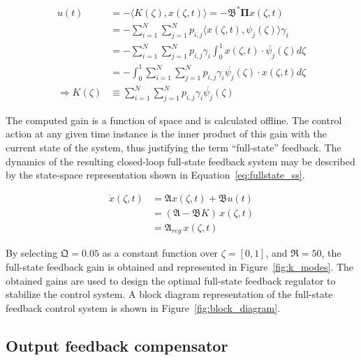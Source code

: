 \begin{equation} \label{eq:fullstate_gain}
    \begin{aligned}
        u(t) &= - \langle K(\zeta), x(\zeta, t) \rangle = - \mathfrak{B}^* \mathbf{\Pi} x(\zeta, t) \\
        &= - \sum_{i=1}^N\sum_{j=1}^N p_{i,j} \langle x(\zeta, t), \psi_j(\zeta) \rangle \gamma_i \\
        &= - \sum_{i=1}^N\sum_{j=1}^N p_{i,j} \gamma_i \int_0^1 x(\zeta, t) \cdot \overline{\psi_j}(\zeta) d\zeta \\
        &= - \int_0^1 \sum_{i=1}^N\sum_{j=1}^N p_{i,j} \gamma_i \overline{\psi_j}(\zeta) \cdot x(\zeta, t) d\zeta \\
        \Rightarrow K(\zeta) &\equiv \sum_{i=1}^N\sum_{j=1}^N p_{i,j} \gamma_i \overline{\psi_j}(\zeta)
    \end{aligned}
\end{equation}

The computed gain is a function of space and is calculated offline. The control action at any given time instance is the inner product of this gain with the current state of the system, thus justifying the term ``full-state'' feedback. The dynamics of the resulting closed-loop full-state feedback system may be described by the state-space representation shown in Equation~\ref{eq:fullstate_ss}.

\begin{equation}
    \begin{aligned} \label{eq:fullstate_ss}
        \dot{x}(\zeta, t) &= \mathfrak{A} x(\zeta, t) + \mathfrak{B} u(t) \\
        &= (\mathfrak{A} - \mathfrak{B} K) \, x(\zeta, t) \\
        &= \mathfrak{A}_{reg} \, x(\zeta, t)
    \end{aligned}
\end{equation}

By selecting $\mathfrak{Q} = 0.05$ as a constant function over $\zeta = [0,1]$, and $\mathfrak{R} = 50$, the full-state feedback gain is obtained and represented in Figure~\ref{fig:k_modes}. The obtained gains are used to design the optimal full-state feedback regulator to stabilize the control system. A block diagram representation of the full-state feedback control system is shown in Figure~\ref{fig:block_diagram}.

\subsection{Output feedback compensator}

